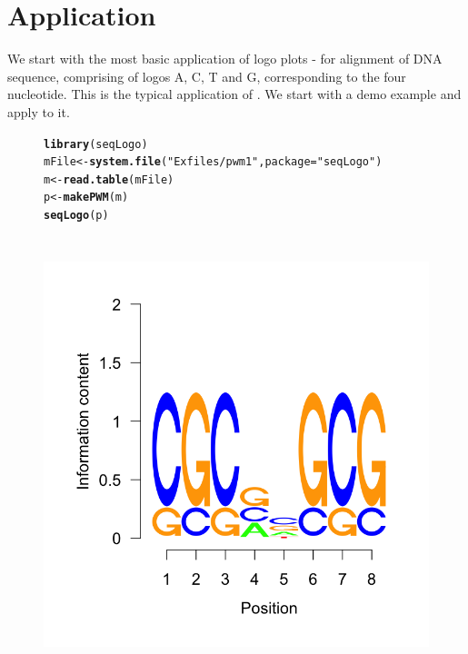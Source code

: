\documentclass[12pt]{article}\usepackage[]{graphicx}\usepackage[usenames,dvipsnames]{color}
\makeatletter
\newcommand{\hlstr}[1]{\textcolor[rgb]{0.192,0.494,0.8}{#1}}%
\newcommand{\hlstd}[1]{\textcolor[rgb]{0.345,0.345,0.345}{#1}}%
\newcommand{\hlkwb}[1]{\textcolor[rgb]{0.69,0.353,0.396}{#1}}%
\newcommand{\hlkwc}[1]{\textcolor[rgb]{0.333,0.667,0.333}{#1}}%
\newcommand{\hlkwd}[1]{\textcolor[rgb]{0.737,0.353,0.396}{\textbf{#1}}}%
\newenvironment{kframe}{%
 \def\at@end@of@kframe{}%
 \ifinner\ifhmode%
  \def\at@end@of@kframe{\end{minipage}}%
  \begin{minipage}{\columnwidth}%
 \fi\fi%
 \def\FrameCommand##1{\hskip\@totalleftmargin \hskip-\fboxsep
 \colorbox{shadecolor}{##1}\hskip-\fboxsep
     \hskip-\linewidth \hskip-\@totalleftmargin \hskip\columnwidth}%
 \MakeFramed {\advance\hsize-\width
   \@totalleftmargin\z@ \linewidth\hsize
   \@setminipage}}%
 {\par\unskip\endMakeFramed%
 \at@end@of@kframe}
\newenvironment{knitrout}{}{} %
\makeatother
\begin{document}
\section{Application}

We start with the most basic application of logo plots - for alignment of DNA sequence, comprising of logos A, C, T and G, corresponding to the four nucleotide. This is the typical application of . We start with a demo example and apply  to it.

\begin{figure}[h]
\begin{center}
\begin{knitrout}
\color{fgcolor}\begin{kframe}
\begin{alltt}
\hlkwd{library}\hlstd{(seqLogo)}
\hlstd{mFile} \hlkwb{<-} \hlkwd{system.file}\hlstd{(}\hlstr{"Exfiles/pwm1"}\hlstd{,} \hlkwc{package}\hlstd{=}\hlstr{"seqLogo"}\hlstd{)}
\hlstd{m} \hlkwb{<-} \hlkwd{read.table}\hlstd{(mFile)}
\hlstd{p} \hlkwb{<-} \hlkwd{makePWM}\hlstd{(m)}
\hlkwd{seqLogo}\hlstd{(p)}
\end{alltt}
\end{kframe}
\includegraphics[width=5in,height=5in]{figure/seqlogo_use-1} 

\end{knitrout}
\end{center}
\end{figure}
\end{document}
